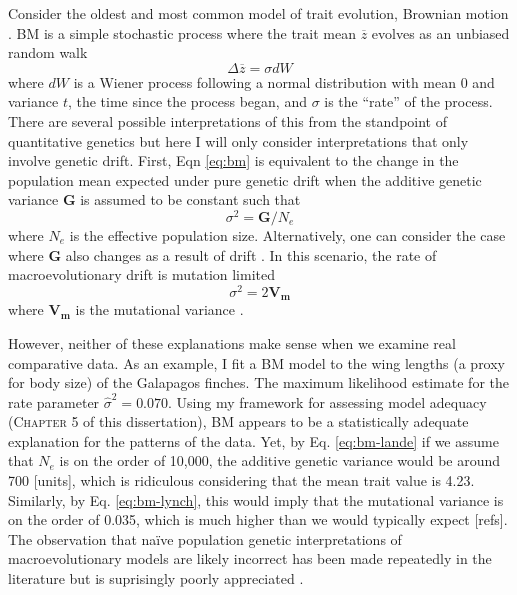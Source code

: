 Consider the oldest and most common model of trait evolution, Brownian motion \citep[BM;][]{Edwards1964, Felsenstein1973, Thompson1975, Felsenstein1985}. BM is a simple stochastic process where the trait mean $\overline{z}$ evolves as an unbiased random walk
\begin{equation}\label{eq:bm}
\Delta \overline{z}=\sigma dW
\end{equation}
where $dW$ is a Wiener process following a normal distribution with mean 0 and variance $t$, the time since the process began, and $\sigma$ is the ``rate'' of the process. There are several possible interpretations of this from the standpoint of quantitative genetics \citep{Felsenstein1988, HansenMartins1996} but here I will only consider interpretations that only involve genetic drift. First, Eqn \ref{eq:bm} is equivalent to the change in the population mean expected under pure genetic drift when the additive genetic variance $\mathbf{G}$ is assumed to be constant \citep{Lande1976} such that
\begin{equation}\label{eq:bm-lande} 
\sigma^{\text{2}}=\mathbf{G}/N_e
\end{equation}
where $N_e$ is the effective population size. Alternatively, one can consider the case where $\mathbf{G}$ also changes as a result of drift \citep{LynchHill1986}. In this scenario, the rate of macroevolutionary drift is mutation limited \citep{Felsenstein1988, Lynch1989}
\begin{equation}\label{eq:bm-lynch}
\sigma^{\text{2}}=\text{2}\mathbf{V_m}
\end{equation}
where $\mathbf{V_m}$ is the mutational variance \citep[see][for details]{LynchWalshbook}.

However, neither of these explanations make sense when we examine real comparative data. As an example, I fit a BM model to the wing lengths (a proxy for body size) of the Galapagos finches. The maximum likelihood estimate for the rate parameter $\hat{\sigma}^{\text{2}}=\text{0.070}$. Using my framework for assessing model adequacy (\textsc{Chapter 5} of this dissertation), BM appears to be a statistically adequate explanation for the patterns of the data. Yet, by Eq. \ref{eq:bm-lande} if we assume that $N_e$ is on the order of 10,000, the additive genetic variance would be around 700 [units], which is ridiculous considering that the mean trait value is 4.23. Similarly, by Eq. \ref{eq:bm-lynch}, this would imply that the mutational variance is on the order of 0.035, which is much higher than we would typically expect [refs]. The observation that na\"{i}ve population genetic interpretations of macroevolutionary models are likely incorrect has been made repeatedly in the literature \citep[e.g.,][]{Felsenstein1988, Lynch1990, HansenMartins1996, EstesArnold2007, HohenloheArnold2008, Harmon2010} but is suprisingly poorly appreciated \citep{Pennellpcmbook}. 


